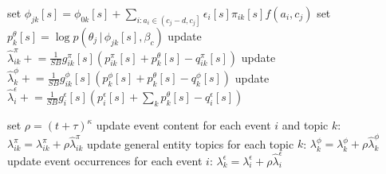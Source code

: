 \documentclass{article}
\newcommand{\pluseq}{\mathrel{+}=}
\newcommand{\g}{\, | \,}
\begin{document}
\begin{algorithm}[h]
\begin{algorithmic}[1]
				\State set $\phi_{jk}[s] = \phi_{0k}[s] + \sum_{i : a_i \in \left( c_j - d, c_j \right]}\epsilon_i[s] \pi_{ik}[s] f(a_i, c_j)$
				\State set $p^\theta_k[s] = \log p(\theta_j \g \phi_{jk}[s], \beta_c)$
					\State update $\hat\lambda^{\pi}_{ik} \pluseq \frac{1}{SB} g^\pi_{ik}[s] ( p^\pi_{ik}[s] + p^\theta_k[s] -  q^\pi_{ik}[s] ) $
				\EndFor
				\State update $\hat\lambda^{\phi}_{k} \pluseq \frac{1}{SB} g^\phi_{ik}[s] ( p^\phi_{k}[s] + p^\theta_k[s] -  q^\phi_{k}[s] ) $
			\EndFor
				\State update $\hat\lambda^{\epsilon}_{i} \pluseq \frac{1}{SB} g^\epsilon_{i}[s] ( p^\epsilon_{i}[s] + \sum_k p^\theta_k[s] -  q^\epsilon_{i}[s] ) $
			\EndFor
			
		\EndFor
	\EndFor
	\State set $\rho= (t +\tau)^\kappa$
	\State update event content for each event $i$ and topic $k$: $\lambda^{\pi}_{ik} = \lambda^{\pi}_{ik} + \rho \hat\lambda^{\pi}_{ik} $
	\State update general entity topics for each topic $k$: $\lambda^{\phi}_{k} = \lambda^{\phi}_{k} + \rho \hat\lambda^{\phi}_{k}$
	\State update event occurrences for each event $i$: $\lambda^{\epsilon}_{k} = \lambda^{\epsilon}_{i} + \rho \hat\lambda^{\epsilon}_{i}$
\end{algorithmic}
\end{algorithm}
\end{document}
